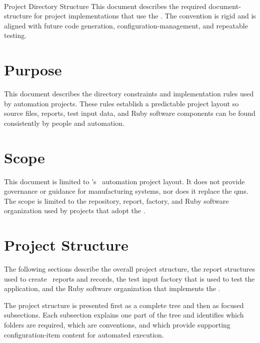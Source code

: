 \documentclass[11pt]{tlc-article}%
\begin{document}
%

\tlcTitlePageAndTableOfContents%
  {\af\ \\ Project Directory Structure}%
  {\autodocDepartmentName}%
  {This document describes the required \gls{document-structure} for project
  implementations that use the \af. The convention is rigid and is aligned
  with future code generation, \gls{configuration-management}, and repeatable
  \gls{testing}.}%

\section{Purpose}
This document describes the directory constraints and implementation rules used
by automation projects. These rules establish a predictable project layout so
source files, \glspl{report}, test input data, and Ruby software components can
be found consistently by people and automation.

\tlcVspace%

\section{Scope}
This document is limited to \fk's \team\ automation project layout. It does not
provide governance or guidance for manufacturing systems, nor does it replace
the \gls{qms}. The scope is limited to the repository, report, factory, and Ruby
software organization used by projects that adopt the \af.

\tlcVspace%

\section{Project Structure}
The following sections describe the overall project structure, the report
structures used to create \docControl\ reports and records, the test input
factory that is used to test the application, and the Ruby software
organization that implements the \af.

\tlcVspace%

The project structure is presented first as a complete tree and then as focused
subsections. Each subsection explains one part of the tree and identifies which
folders are required, which are conventions, and which provide supporting
\gls{configuration-item} content for automated execution.

\tlcVspace%


\tlcVspace%

%
%
%
%
%
\printGlossaries%
%
%
\end{document}
